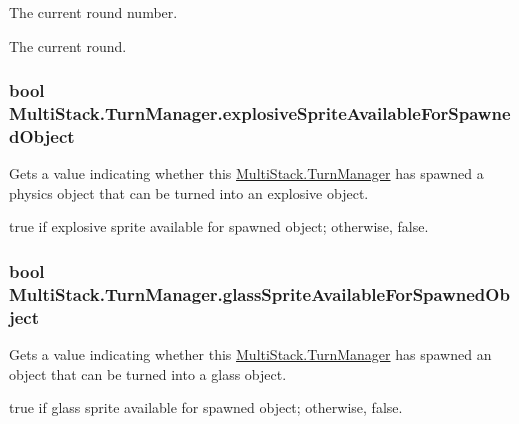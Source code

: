 The current round number. 

The current round.\hypertarget{class_multi_stack_1_1_turn_manager_aa811a8a5c996e0cf99295d7829727874}{}
\subsubsection[{explosive\+Sprite\+Available\+For\+Spawned\+Object}]{\setlength{\rightskip}{0pt plus 5cm}bool Multi\+Stack.\+Turn\+Manager.\+explosive\+Sprite\+Available\+For\+Spawned\+Object\hspace{0.3cm}{\ttfamily [get]}}\label{class_multi_stack_1_1_turn_manager_aa811a8a5c996e0cf99295d7829727874}


Gets a value indicating whether this \hyperlink{class_multi_stack_1_1_turn_manager}{Multi\+Stack.\+Turn\+Manager} has spawned a physics object that can be turned into an explosive object. 

{\ttfamily true} if explosive sprite available for spawned object; otherwise, {\ttfamily false}.\hypertarget{class_multi_stack_1_1_turn_manager_a2e2e26f02fda080730d6bd6c5e837e72}{}
\subsubsection[{glass\+Sprite\+Available\+For\+Spawned\+Object}]{\setlength{\rightskip}{0pt plus 5cm}bool Multi\+Stack.\+Turn\+Manager.\+glass\+Sprite\+Available\+For\+Spawned\+Object\hspace{0.3cm}{\ttfamily [get]}}\label{class_multi_stack_1_1_turn_manager_a2e2e26f02fda080730d6bd6c5e837e72}


Gets a value indicating whether this \hyperlink{class_multi_stack_1_1_turn_manager}{Multi\+Stack.\+Turn\+Manager} has spawned an object that can be turned into a glass object. 

{\ttfamily true} if glass sprite available for spawned object; otherwise, {\ttfamily false}.\hypertarget{class_multi_stack_1_1_turn_manager_a7da3b19311001850c30860447304a5b4}{}
